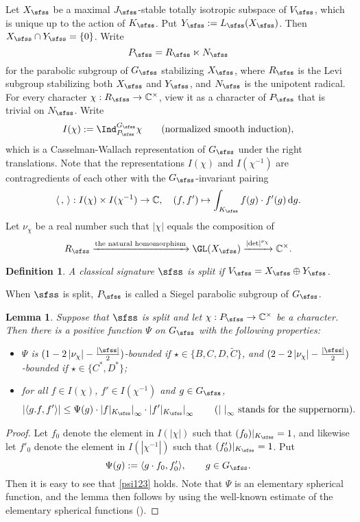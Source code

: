 \documentclass[12pt,a4paper]{amsart}
\def\abs#1{\left|{#1}\right|}
\newcommand{\od}{\operatorname{d}}
\newcommand{\la}{\langle}
\newcommand{\ra}{\rangle}
\newcommand{\be}{\begin {equation}}
\newcommand{\ee}{\end {equation}}
\numberwithin{equation}{section}
\newtheorem{lem}[thm]{Lemma}
\newtheorem{defn}[thm]{Definition}
\theoremstyle{remark}
\begin{document}
Let $X_\sfss$ be a maximal $J_\sfss$-stable totally isotropic subspace of $V_\sfss$, which is unique  up to the action of $K_\sfss$. Put $Y_\sfss:=L_\sfss(X_\sfss)$. Then $X_\sfss\cap Y_\sfss=\{0\}$.
Write
\[
P_\sfss=R_\sfss\ltimes N_\sfss
\]
 for the parabolic subgroup of $G_\sfss$ stabilizing $X_\sfss$, where $R_\sfss$ is the Levi subgroup stabilizing both $X_\sfss$ and $Y_\sfss$, and $N_\sfss$ is the unipotent radical. For every character $\chi: R_\sfss\rightarrow \C^\times$, view it as a character of $P_\sfss$ that is trivial on $N_\sfss$. Write
\[
  I(\chi):=\Ind_{P_\sfss}^{G_\sfss}\chi \qquad(\textrm{normalized smooth induction}),
\]
which is a Casselman-Wallach representation of $G_\sfss$ under the right translations. Note that the representations   $I(\chi)$ and $ I(\chi^{-1})$ are contragredients of each other with the $G_\sfss$-invariant pairing
 \[
  \la\,,\,\ra:  I(\chi)\times I(\chi^{-1})\rightarrow \C, \quad (f, f')\mapsto \int_{K_\sfss} f(g) \cdot f'(g) \od\!g.
 \]
Let $\nu_\chi$ be a real number such that $\abs{\chi}$ equals the composition of
\be\label{nuchi}
   R_\sfss\xrightarrow{\textrm{the natural homomorphism} }\GL(X_\sfss)\xrightarrow{\abs{\det}^{\nu_\chi}} \C^\times.
\ee

\begin{defn}
A classical signature $\sfss$ is split if $V_\sfss=X_\sfss\oplus Y_\sfss$.
\end{defn}

When $\sfss$ is split, $P_\sfss$ is called a Siegel parabolic subgroup of $G_\sfss$.

\begin{lem}\label{growthdp}
Suppose that $\sfss$ is split and let $\chi: P_\sfss\rightarrow \C^\times$ be a character. Then there is a positive function $\Psi$ on $G_\sfss$ with the following properties:
\begin{itemize}
\item
 $\Psi$ is $(1-2\abs{\nu_\chi}-\frac{\abs{\sfss}}{2})$-bounded if $\star\in \{B,C,D, \widetilde C\}$, and  $(2-2\abs{\nu_\chi}-\frac{\abs{\sfss}}{2})$-bounded if $\star\in \{C^*,D^*\}$;
 \item
for all $f\in I(\chi)$, $f'\in I(\chi^{-1})$ and $g\in G_\sfss$,
\be\label{psi123}
\abs{ \la g.f, f'\ra}\leq \Psi(g) \cdot \abs{f|_{K_\sfss}}_\infty \cdot \abs{f'|_{K_\sfss}}_\infty\qquad(\textrm{$\abs{\,\,}_\infty$ stands for the suppernorm}).
\ee
\end{itemize}
\end{lem}
\begin{proof}

 Let $f_0$ denote the element in $I(\abs{\chi})$ such that $(f_0)|_{K_\sfss}=1$, and likewise let $f'_0$ denote the element in $I(\abs{\chi^{-1}})$ such that $(f'_0)|_{K_\sfss}=1$. Put
 \[
   \Psi(g):=\la g \cdot f_0, f_0'\ra, \qquad g\in G_\sfss.
 \]
 Then it is easy to see that \eqref{psi123} holds. Note that $\Psi$ is an elementary spherical function, and the lemma then follows by using the well-known estimate of the elementary spherical functions (\cite[Lemma 3.6.7]{Wa1}).
\end{proof}
\end{document}
